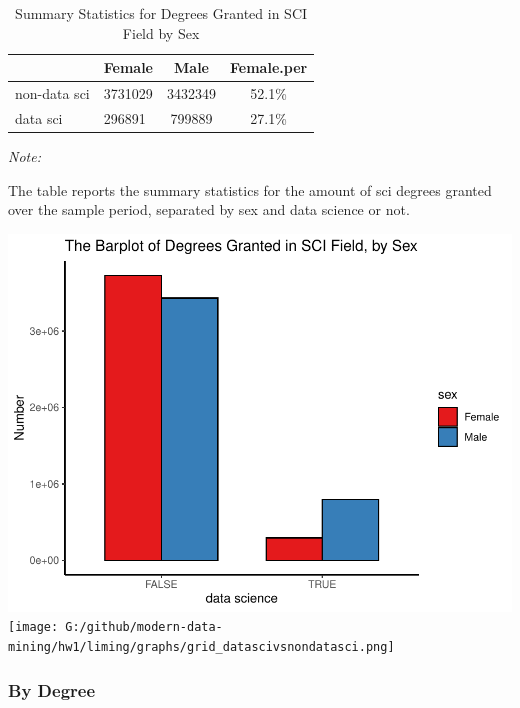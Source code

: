 \documentclass[
  12pt,
]{article}
\begin{document}
\begin{table}[H]

\caption{\label{tab:unnamed-chunk-12}Summary Statistics for Degrees Granted in SCI Field by Sex}
\centering
\begin{threeparttable}
\begin{tabular}[t]{llcc}
\toprule
  & Female & Male & Female.per\\
\midrule
non-data sci & 3731029 & 3432349 & 52.1\%\\
data sci & 296891 & 799889 & 27.1\%\\
\bottomrule
\end{tabular}
\begin{tablenotes}
\item \textit{Note: } 
\item The table reports the summary statistics for the amount of sci degrees granted over the sample period, separated by sex and data science or not.
\end{tablenotes}
\end{threeparttable}
\end{table}

\includegraphics{hw1_sol_files/figure-latex/unnamed-chunk-12-1.pdf}
\texttt{[image: G:/github/modern-data-mining/hw1/liming/graphs/grid\_datascivsnondatasci.png]}

\hypertarget{by-degree}{%
\subsubsection{By Degree}\label{by-degree}}
\end{document}
